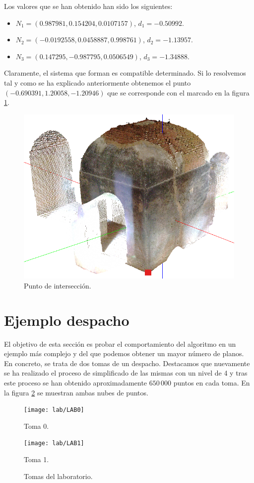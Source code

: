 Los valores que se han obtenido han sido los siguientes:
\begin{itemize}
\item $ N_1 = ( 0.987981, 0.154204, 0.0107157) $, $ d_1 = -0.50992 $.
\item $ N_2 = ( -0.0192558, 0.0458887, 0.998761) $, $ d_2 = -1.13957 $.
\item $ N_3 = ( 0.147295, -0.987795, 0.0506549) $, $ d_3 = -1.34888$.
\end{itemize}
Claramente, el sistema que forman es compatible determinado. Si lo resolvemos tal y como se ha explicado anteriormente obtenemos el punto $ (-0.690391, 1.20058, -1.20946) $ que se corresponde con el marcado en la figura \ref{fig:torre1-4}.
\begin{figure}
	\centering
	\includegraphics[width=0.4\linewidth]{imagenes/Ej-RANSAC/torre_1-4}
	\caption{Punto de intersección.}
	\label{fig:torre1-4}
\end{figure}


\section{Ejemplo despacho}
El objetivo de esta sección es probar el comportamiento del algoritmo en un ejemplo más complejo y del que podemos obtener un mayor número de planos. En concreto, se trata de dos tomas de un despacho. Destacamos que nuevamente se ha realizado el proceso de simplificado de las mismas con un nivel de 4 y tras este proceso se han obtenido aproximadamente $ 650\,000 $ puntos en cada toma. En la figura \ref{fig:tomasLab} se muestran ambas nubes de puntos. 

\begin{figure}[h!]
	\begin{minipage}[b]{0.5\textwidth}
		\centering
		\texttt{[image: lab/LAB0]} 
		\caption*{Toma 0.}
	\end{minipage}
	\begin{minipage}[b]{0.5\textwidth}
		\centering
		\texttt{[image: lab/LAB1]} 
		\caption*{Toma 1.}
	\end{minipage}
	\caption{Tomas del laboratorio.}
	\label{fig:tomasLab}
\end{figure}

